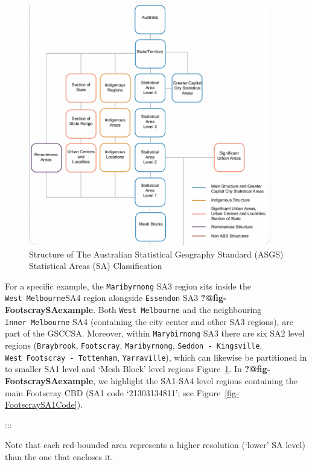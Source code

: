 \documentclass[
  letterpaper,
  DIV=11,
  numbers=noendperiod]{scrartcl}
\begin{document}
\begin{figure}

{\centering \includegraphics[width=4.16667in,height=\textheight]{figures/ASGS_Diagram_2021.png}

}

\caption{\label{fig-ASGS}Structure of The Australian Statistical
Geography Standard (ASGS) Statistical Areas (SA) Classification}

\end{figure}

For a specific example, the \texttt{Maribyrnong} SA3 region sits inside
the \texttt{West\ Melbourne}SA4 region alongside \texttt{Essendon} SA3
\textbf{?@fig-FootscraySAexample}. Both \texttt{West\ Melbourne} and the
neighbouring \texttt{Inner\ Melbourne} SA4 (containing the city center
and other SA3 regions), are part of the GSCCSA. Moreover, within
\texttt{Marybirnong} SA3 there are six SA2 level regions
(\texttt{Braybrook}, \texttt{Footscray}, \texttt{Maribyrnong},
\texttt{Seddon\ -\ Kingsville}, \texttt{West\ Footscray\ -\ Tottenham},
\texttt{Yarraville}), which can likewise be partitioned in to smaller
SA1 level and `Mesh Block' level regions Figure~\ref{fig-ASGS}. In
\textbf{?@fig-FootscraySAexample}, we highlight the SA1-SA4 level
regions containing the main Footscray CBD (SA1 code `21303134811'; see
Figure~\ref{fig-FootscraySA1Code}).

:::

Note that each red-bounded area represents a higher resolution (`lower'
SA level) than the one that encloses it.
\end{document}
